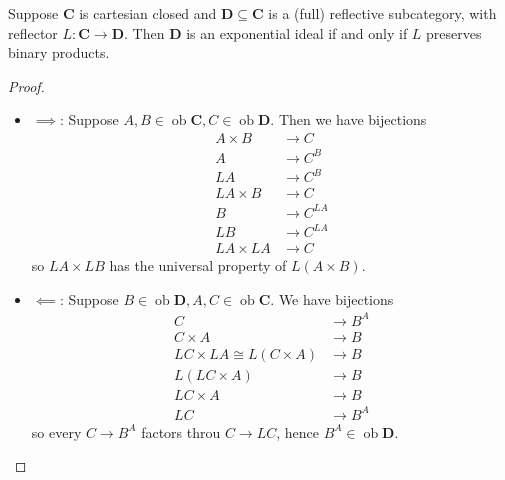 \documentclass[a4paper]{article}
\renewcommand{\c}[1]{\mathbf{#1}}
\DeclareMathOperator{\ob}{ob}
\begin{document}
\begin{lemma}
  Suppose \(\c C\) is cartesian closed and \(\c D \subseteq \c C\) is a (full) reflective subcategory, with reflector \(L: \c C \to \c D\). Then \(\c D\) is an exponential ideal if and only if \(L\) preserves binary products.
\end{lemma}

\begin{proof}\leavevmode
  \begin{itemize}
  \item \(\implies\): Suppose \(A, B \in \ob \c C, C \in \ob \c D\). Then we have bijections
    \begin{align*}
      A \times B &\to C \\
      A &\to C^B \\
      LA &\to C^B \\
      LA \times B &\to C \\
      B &\to C^{LA} \\
      LB &\to C^{LA} \\
      LA \times LA &\to C
    \end{align*}
    so \(LA \times LB\) has the universal property of \(L(A \times B)\).
  \item \(\impliedby\): Suppose \(B \in \ob \c D, A, C \in \ob \c C\). We have bijections
    \begin{align*}
      C &\to B^A \\
      C \times A &\to B \\
      LC \times LA \cong L(C \times A) &\to B \\
      L(LC \times A) &\to B \\
      LC \times A &\to B \\
      LC &\to B^A
    \end{align*}
    so every \(C \to B^A\) factors throu \(C \to LC\), hence \(B^A \in \ob \c D\).
  \end{itemize}
\end{proof}


\printindex
\end{document}
